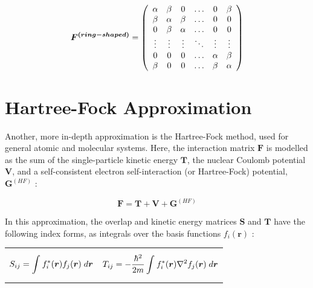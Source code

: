 \begin{equation}\label{eq:HuckelMatrix}
\boldsymbol{F^{(ring-shaped)}} = 
  \left(\begin{array}{c c c c c c}
    \alpha & \beta & 0 & \ldots & 0 & \beta \\
    \beta & \alpha & \beta & \ldots & 0 & 0 \\
    0 & \beta & \alpha & \ldots & 0 & 0 \\
    \vdots & \vdots & \vdots & \ddots & \vdots & \vdots \\
    0 & 0 & 0 & \ldots & \alpha & \beta \\
    \beta & 0 & 0 & \ldots & \beta & \alpha \\
  \end{array}\right)
\end{equation}
\clearpage


\section{Hartree-Fock Approximation}\label{sec:hartreefock}

Another, more in-depth approximation is the Hartree-Fock method, used for general atomic and molecular systems. Here, the interaction matrix $\boldsymbol{F}$ is modelled as the sum of the single-particle kinetic energy $\boldsymbol{T}$, the nuclear Coulomb potential $\boldsymbol{V}$, and a self-consistent electron self-interaction (or Hartree-Fock) potential, $\boldsymbol{G}^{(HF)}$ \cite{laaksonen_fully_1986}:

\begin{equation}\label{eq:HartreeFockHamiltonian}
\boldsymbol{F}=\boldsymbol{T}+\boldsymbol{V}+\boldsymbol{G}^{(HF)}
\end{equation}

In this approximation, the overlap and kinetic energy matrices $\boldsymbol{S}$ and $\boldsymbol{T}$ have the following index forms, as integrals over the basis functions $f_i(\boldsymbol{r})$ \cite{quiney_art_nodate}: 

\vspace{-0.7cm}
\begin{center}
\begin{tabular}{p{7cm}p{9.4cm}}

\begin{equation}\label{eq:HartreeFockS}
S_{ij}=\int_{}^{}f_i^*(\boldsymbol{r})f_{j}(\boldsymbol{r}) \thickspace d\boldsymbol{r}
\end{equation}

&

\begin{equation}\label{eq:HartreeFockT}
T_{ij}=-\frac{\hbar^2}{2m}\int_{}^{}f_i^*(\boldsymbol{r})\nabla^2f_{j}(\boldsymbol{r}) \thickspace d\boldsymbol{r}
\end{equation}

\end{tabular}
\end{center}

